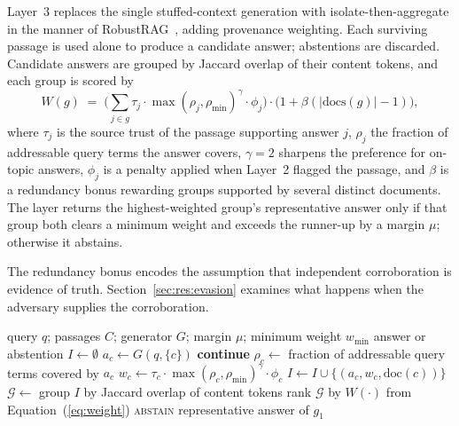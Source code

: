 \documentclass[information,article,submit,moreauthors]{Definitions/mdpi}
\begin{document}
Layer~3 replaces the single stuffed-context generation with isolate-then-aggregate in the
manner of RobustRAG~\citep{xiang2024robustrag}, adding provenance weighting. Each surviving
passage is used alone to produce a candidate answer; abstentions are discarded. Candidate
answers are grouped by Jaccard overlap of their content tokens, and each group is scored by
\begin{equation}
W(g) \;=\; \Big(\textstyle\sum_{j \in g} \tau_j \cdot \max(\rho_j, \rho_{\min})^{\gamma} \cdot \phi_j\Big)
\cdot \big(1 + \beta \left(|\mathrm{docs}(g)| - 1\right)\big),
\label{eq:weight}
\end{equation}
where $\tau_j$ is the source trust of the passage supporting answer $j$, $\rho_j$ the fraction
of addressable query terms the answer covers, $\gamma = 2$ sharpens the preference for
on-topic answers, $\phi_j$ is a penalty applied when Layer~2 flagged the passage, and $\beta$
is a redundancy bonus rewarding groups supported by several distinct documents. The layer
returns the highest-weighted group's representative answer only if that group both clears a
minimum weight and exceeds the runner-up by a margin $\mu$; otherwise it abstains.

The redundancy bonus encodes the assumption that independent corroboration is evidence of
truth. Section~\ref{sec:res:evasion} examines what happens when the adversary supplies the
corroboration.

\begin{algorithm}[H]
\caption{Layer 3: isolate-then-aggregate with provenance weighting}
\label{alg:l3}
\begin{algorithmic}[1]
\Require query $q$; passages $C$; generator $G$; margin $\mu$; minimum weight $w_{\min}$
\Ensure answer or abstention
\State $I \gets \emptyset$
  \State $a_c \gets G(q, \{c\})$ 
   \State \textbf{continue} \EndIf
  \State $\rho_c \gets$ fraction of addressable query terms covered by $a_c$
  \State $w_c \gets \tau_c \cdot \max(\rho_c, \rho_{\min})^{\gamma} \cdot \phi_c$
  \State $I \gets I \cup \{(a_c, w_c, \mathrm{doc}(c))\}$
\EndFor
\State $\mathcal{G} \gets$ group $I$ by Jaccard overlap of content tokens
\State rank $\mathcal{G}$ by $W(\cdot)$ from Equation~(\ref{eq:weight})
  \State \Return \textsc{abstain} 
\EndIf
\State \Return representative answer of $g_1$
\end{algorithmic}
\end{algorithm}
\end{document}

